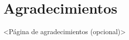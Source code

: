 %
\section*{Agradecimientos}
\label{sec::agradecimientos}


<Página de agradecimientos (opcional)>





